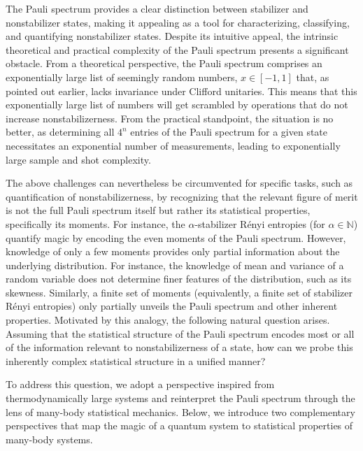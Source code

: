 \documentclass[aps,pra,superscriptaddress,twocolumn,longbibliography]{revtex4-2}
\begin{document}
The Pauli spectrum provides a clear distinction between stabilizer and nonstabilizer states, making it appealing as a tool for characterizing, classifying, and quantifying nonstabilizer states.
Despite its intuitive appeal, the intrinsic theoretical and practical complexity of the Pauli spectrum presents a significant obstacle.
From a theoretical perspective, the Pauli spectrum comprises an exponentially large list of seemingly random numbers, $x\in [-1,1]$ that, as pointed out earlier, lacks invariance under Clifford unitaries.
This means that this exponentially large list of numbers will get scrambled by operations that do not increase nonstabilizerness.
From the practical standpoint, the situation is no better, as determining all $4^{n}$ entries of the Pauli spectrum for a given state necessitates an exponential number of measurements, leading to exponentially large sample and shot complexity.


The above challenges can nevertheless be circumvented for specific tasks, such as quantification of nonstabilizerness, by recognizing that the relevant figure of merit is not the full Pauli spectrum itself but rather its statistical properties, specifically its moments.
For instance, the $\alpha$-stabilizer Rényi entropies (for $\alpha \in \mathbb{N}$) quantify magic by encoding the even moments of the Pauli spectrum. 
However, knowledge of only a few moments provides only partial information about the underlying distribution. 
For instance, the knowledge of mean and variance of a random variable does not determine finer features of the distribution, such as its skewness.
Similarly, a finite set of moments (equivalently, a finite set of stabilizer Rényi entropies) only partially unveils the Pauli spectrum and other inherent properties. 
Motivated by this analogy, the following natural question arises.
Assuming that the statistical structure of the Pauli spectrum encodes most or all of the information relevant to nonstabilizerness of a state, how can we probe this inherently complex statistical structure in a unified manner?


To address this question, we adopt a perspective inspired from thermodynamically large systems and reinterpret the Pauli spectrum through the lens of many-body statistical mechanics.
Below, we introduce two complementary perspectives that map the magic of a quantum system to statistical properties of many-body systems.
\end{document}
